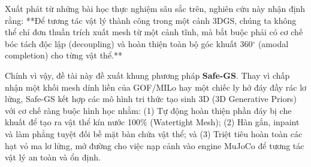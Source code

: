Xuất phát từ những bài học thực nghiệm sâu sắc trên, nghiên cứu này nhận định rằng: **Để tương tác vật lý thành công trong một cảnh 3DGS, chúng ta không thể chỉ đơn thuần trích xuất mesh từ một cảnh tĩnh, mà bắt buộc phải có cơ chế bóc tách độc lập (decoupling) và hoàn thiện toàn bộ góc khuất 360$^\circ$ (amodal completion) cho từng vật thể.**

Chính vì vậy, đề tài này đề xuất khung phương pháp \textbf{Safe-GS}. Thay vì chấp nhận một khối mesh dính liền của GOF/MILo hay một chiếc ly hở đáy đầy rác lơ lửng, Safe-GS kết hợp các mô hình tri thức tạo sinh 3D (3D Generative Priors) với cơ chế ràng buộc hình học nhằm: (1) Tự động hoàn thiện phần đáy bị che khuất để tạo ra vật thể kín nước 100\% (Watertight Mesh); (2) Hàn gắn, inpaint và làm phẳng tuyệt đối bề mặt bàn chứa vật thể; và (3) Triệt tiêu hoàn toàn các hạt vỏ ma lơ lửng, mở đường cho việc nạp cảnh vào engine MuJoCo để tương tác vật lý an toàn và ổn định.

